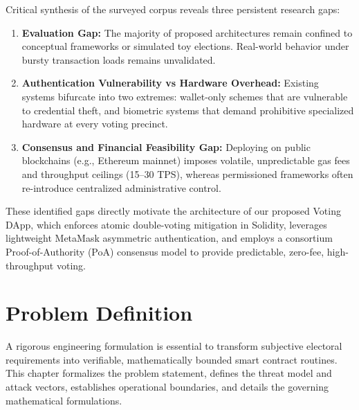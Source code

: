 \documentclass[12pt,a4paper]{report}
\begin{document}
\endgroup

Critical synthesis of the surveyed corpus reveals three persistent research gaps:
\begin{enumerate}
    \item \textbf{Evaluation Gap:} The majority of proposed architectures remain confined to conceptual frameworks or simulated toy elections. Real-world behavior under bursty transaction loads remains unvalidated.
    \item \textbf{Authentication Vulnerability vs Hardware Overhead:} Existing systems bifurcate into two extremes: wallet-only schemes that are vulnerable to credential theft, and biometric systems that demand prohibitive specialized hardware at every voting precinct.
    \item \textbf{Consensus and Financial Feasibility Gap:} Deploying on public blockchains (e.g., Ethereum mainnet) imposes volatile, unpredictable gas fees and throughput ceilings (15--30 TPS), whereas permissioned frameworks often re-introduce centralized administrative control.
\end{enumerate}

These identified gaps directly motivate the architecture of our proposed Voting DApp, which enforces atomic double-voting mitigation in Solidity, leverages lightweight MetaMask asymmetric authentication, and employs a consortium Proof-of-Authority (PoA) consensus model to provide predictable, zero-fee, high-throughput voting.

\chapter{Problem Definition}

A rigorous engineering formulation is essential to transform subjective electoral requirements into verifiable, mathematically bounded smart contract routines. This chapter formalizes the problem statement, defines the threat model and attack vectors, establishes operational boundaries, and details the governing mathematical formulations.
\end{document}
